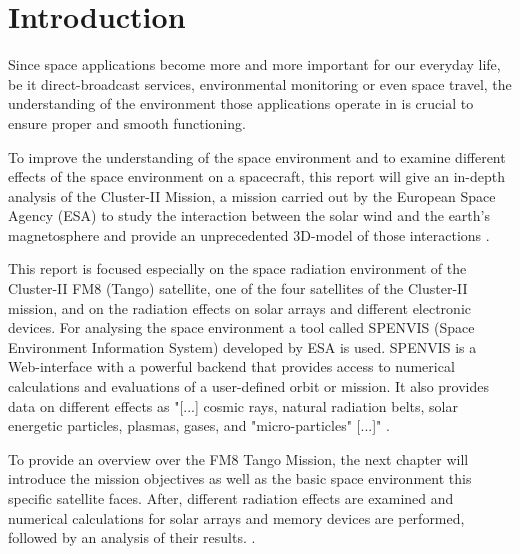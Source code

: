 \section{Introduction}

Since space applications become more and more important for our everyday life, be it direct-broadcast services, environmental monitoring or even space travel, the understanding of the environment those applications operate in is crucial to ensure proper and smooth functioning.

To improve the understanding of the space environment and to examine different effects of the space environment on a spacecraft, this report will give an in-depth analysis of the Cluster-II Mission, a mission carried out by the European Space Agency (ESA) to study the interaction between the solar wind and the earth's magnetosphere and provide an unprecedented 3D-model of those interactions \citep{ESA:clusterWebsite}.

This report is focused especially on the space radiation environment of the Cluster-II FM8 (Tango) satellite, one of the four satellites of the Cluster-II mission, and on the radiation effects on solar arrays and different electronic devices.
For analysing the space environment a tool called SPENVIS (Space Environment Information System) developed by ESA is used.
SPENVIS is a Web-interface with a powerful backend that provides access to numerical calculations and evaluations of a user-defined orbit or mission. It also provides data on different effects as 
"[...] cosmic rays, natural radiation belts, solar energetic particles, plasmas, gases, and "micro-particles" [...]" \cite{ESA:spenvisWebsite}.

To provide an overview over the FM8 Tango Mission, the next chapter will introduce the mission objectives as well as the basic space environment this specific satellite faces. After, different radiation effects are examined and numerical calculations for solar arrays and memory devices are performed, followed by an analysis of their results. \citep{ESA:spenvisWebsite}.